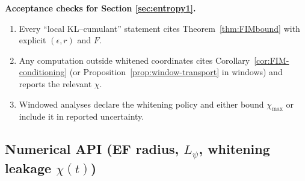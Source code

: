\begin{mdframed}
\textbf{Acceptance checks for Section \ref{sec:entropy1}.}
\begin{enumerate}[leftmargin=*]
\item Every ``local KL--cumulant'' statement cites Theorem~\ref{thm:FIMbound} with explicit $(\epsilon,r)$ and $F$.
\item Any computation outside whitened coordinates cites Corollary~\ref{cor:FIM-conditioning} (or Proposition~\ref{prop:window-transport} in windows) and reports the relevant $\chi$.
\item Windowed analyses declare the whitening policy and either bound $\chi_{\max}$ or include it in reported uncertainty.
\end{enumerate}
\end{mdframed}

\subsection*{Numerical API (EF radius, $L_\psi$, whitening leakage $\chi(t)$)}

